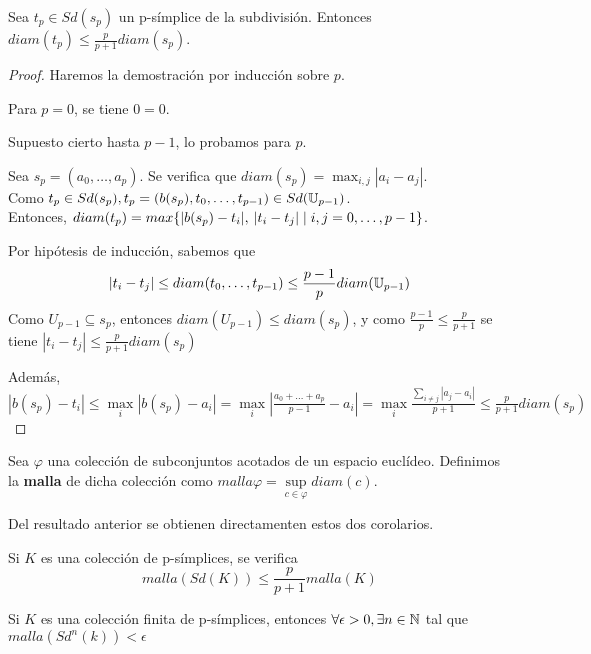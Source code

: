 \begin{proposition}
  Sea $t_p \in Sd(s_p)$ un p-símplice de la subdivisión. Entonces $diam(t_p) \leq \frac{p}{p+1} diam(s_p)$.
\end{proposition}

\begin{proof}
  Haremos la demostración por inducción sobre $p$.

  Para $p = 0$, se tiene $0 = 0$.

  Supuesto cierto hasta $p-1$, lo probamos para $p$.

  Sea $s_p = (a_0, \dots, a_p)$. Se verifica que $diam(s_p) = \max_{i,j} |a_i - a_j|$. \\
  Como $t_p \in Sd(s_p), t_p = (b(s_p), t_0, \dots, t_{p-1}) \in Sd({\mathbb U}_{p-1})$. \\
  Entonces, $diam(t_p) = max\{|b(s_p) - t_i|,\hspace{0.2em} |t_i - t_j| \mid i,j = 0, \dots, p-1\}$.

  Por hipótesis de inducción, sabemos que
  \[|t_i - t_j| \leq diam(t_0, \dots, t_{p-1}) \leq \frac{p-1}{p} diam({\mathbb U}_{p-1})\]
  Como $U_{p-1} \subseteq s_p$, entonces $diam(U_{p-1}) \leq diam(s_p)$, y como $\frac{p-1}{p} \leq \frac{p}{p+1}$
  se tiene $|t_i - t_j| \leq \frac{p}{p+1} diam(s_p)$

  Además, $|b(s_p) - t_i| \leq \max\limits_i |b(s_p) - a_i| = \max\limits_i |\frac{a_0 + \dots + a_p}{p-1} - a_i| =
  \max\limits_i \frac{\sum\limits_{i \neq j} |a_j - a_i|}{p+1} \leq \frac{p}{p+1} diam(s_p)$
\end{proof}

\begin{definition}
  Sea $\varphi$ una colección de subconjuntos acotados de un espacio euclídeo. Definimos la \textbf{malla} de
  dicha colección como $malla \varphi = \sup\limits_{c \in \varphi} diam(c)$.
\end{definition}

Del resultado anterior se obtienen directamenten estos dos corolarios.

\begin{corollary}
  Si $K$ es una colección de p-símplices, se verifica \[malla(Sd(K)) \leq \frac{p}{p+1} malla(K) \]
\end{corollary}

\begin{corollary}
  Si $K$ es una colección finita de p-símplices, entonces $\forall \epsilon > 0, \exists n \in {\mathbb N}$ tal que \\$malla(Sd^n(k)) < \epsilon$
\end{corollary}

